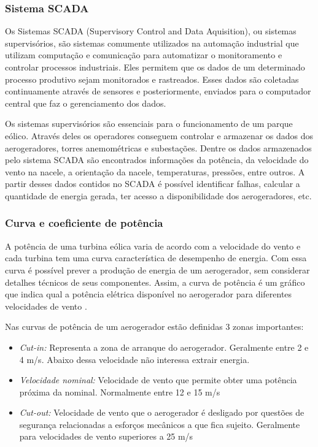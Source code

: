 \subsubsection{Sistema SCADA}
\label{Sec:scada}

Os Sistemas SCADA (Supervisory Control and Data Aquisition), ou sistemas supervisórios, são sistemas comumente utilizados na automação industrial que utilizam computação e comunicação para automatizar o monitoramento e controlar processos industriais. Eles permitem que os dados de um determinado processo produtivo sejam monitorados e rastreados. Esses dados são coletadas continuamente através de sensores e posteriormente, enviados para o computador central que faz o gerenciamento dos dados.

Os sistemas supervisórios são essenciais para o funcionamento de um parque eólico. Através deles os operadores conseguem controlar e armazenar os dados dos aerogeradores, torres anemométricas e subestações. Dentre os dados armazenados pelo sistema SCADA são encontrados informações da potência, da velocidade do vento na nacele, a orientação da nacele, temperaturas, pressões, entre outros. A partir desses dados contidos no SCADA é possível identificar falhas, calcular a quantidade de energia gerada, ter acesso a disponibilidade dos aerogeradores, etc.


\subsubsection{Curva e coeficiente de potência}
\label{Sec:curvaDePotencia}

A potência de uma turbina eólica varia de acordo com a velocidade do vento e cada turbina tem uma curva característica de desempenho de energia. Com essa curva é possível prever a produção de energia de um aerogerador, sem considerar detalhes técnicos de seus componentes. Assim, a curva de potência é um gráfico que indica qual a potência elétrica disponível no aerogerador para diferentes velocidades de vento \cite{iec-power-performance}.

Nas curvas de potência de um aerogerador estão definidas 3 zonas importantes:

\begin{itemize}
  \item \textit{Cut-in:} Representa a zona de arranque do aerogerador. Geralmente entre 2 e 4 m/s. Abaixo dessa velocidade não interessa extrair energia.
  \item \textit{Velocidade nominal:} Velocidade de vento que permite obter uma potência próxima da nominal. Normalmente entre 12 e 15 m/s
  \item \textit{Cut-out:} Velocidade de vento que o aerogerador é desligado por questões de segurança relacionadas a esforços mecânicos a que fica sujeito. Geralmente para velocidades de vento superiores a 25 m/s
\end{itemize}

